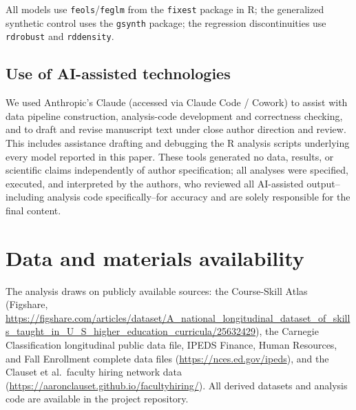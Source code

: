 \documentclass[11pt, letterpaper]{article}
\begin{document}
All models use \texttt{feols}/\texttt{feglm} from the \texttt{fixest} package in R; the generalized synthetic control uses the \texttt{gsynth} package; the regression discontinuities use \texttt{rdrobust} and \texttt{rddensity}.

\subsection*{Use of AI-assisted technologies}
We used Anthropic's Claude (accessed via Claude Code / Cowork) to assist with data pipeline construction, analysis-code development and correctness checking, and to draft and revise manuscript text under close author direction and review. This includes assistance drafting and debugging the R analysis scripts underlying every model reported in this paper. These tools generated no data, results, or scientific claims independently of author specification; all analyses were specified, executed, and interpreted by the authors, who reviewed all AI-assisted output--including analysis code specifically--for accuracy and are solely responsible for the final content.

\section*{Data and materials availability}
The analysis draws on publicly available sources: the Course-Skill Atlas (Figshare, \url{https://figshare.com/articles/dataset/A_national_longitudinal_dataset_of_skills_taught_in_U_S_higher_education_curricula/25632429}), the Carnegie Classification longitudinal public data file, IPEDS Finance, Human Resources, and Fall Enrollment complete data files (\url{https://nces.ed.gov/ipeds}), and the Clauset et al.\ faculty hiring network data (\url{https://aaronclauset.github.io/facultyhiring/}). All derived datasets and analysis code are available in the project repository.

\clearpage


\end{document}
